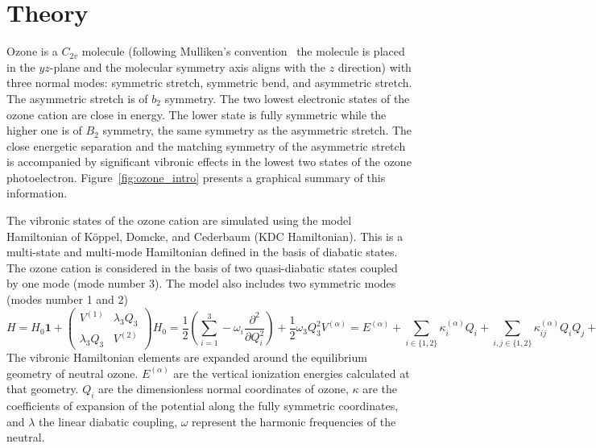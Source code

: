 \documentclass[
12pt,
a4paper,
prb,
superscriptaddress,
]{revtex4}
\begin{document}
\section{Theory}

Ozone is a $C_{2v}$ molecule (following Mulliken's
convention~\cite{Mulliken:55:symnot} the molecule is placed in the $yz$-plane
and the molecular symmetry axis aligns with the $z$ direction) with three
normal modes: symmetric stretch, symmetric bend, and asymmetric stretch.  The
asymmetric stretch is of $b_2$ symmetry. The two lowest electronic states of
the ozone cation are close in energy. The lower state is fully symmetric while
the higher one is of $B_2$ symmetry, the same symmetry as the asymmetric
stretch. The close energetic separation and the matching symmetry of the
asymmetric stretch is accompanied by significant vibronic effects in the
lowest two states of the ozone photoelectron.  Figure~\ref{fig:ozone_intro}
presents a graphical summary of this information.

The vibronic states of the ozone cation are simulated using the model
Hamiltonian of K{\"o}ppel, Domcke, and Cederbaum (KDC
Hamiltonian).\cite{Cederbaum:LVC:84,KDC:81,Koppel:CIbookCh7:04} This is a
multi-state and multi-mode Hamiltonian defined in the basis of diabatic
states. The ozone cation is considered in the basis of two quasi-diabatic
states coupled by one mode (mode number 3). The model also includes two
symmetric modes (modes number 1 and 2)
\begin{subequations}
    \begin{equation}
        H = H _0 \mathbf{1}
        +
        \begin{pmatrix}
            V ^{(1)}  & \lambda _3 Q _3\\
            \lambda _3 Q _3 & V ^{(2)}
        \end{pmatrix}
    \end{equation}
    \begin{equation}
        H _0 = 
        \frac{1}{2} \left(\sum _{i = 1}^3 
        - \omega _i \frac{\partial ^2}{\partial Q _i ^2 }\right)
        + \frac{1}{2}\omega _3 Q _3 ^2
    \end{equation}
    \begin{equation}
        V ^{(\alpha)} = 
        E ^{(\alpha)} 
        + \sum _{i \in \{1,2\}} 
            \kappa ^{(\alpha)} _i Q _i 
        + \sum _{i,j \in \{1,2\}} 
            \kappa ^{(\alpha)} _{ij} Q _i Q _j 
        + \sum _{i,j,k \in \{1,2\}} 
            \kappa ^{(\alpha)} _{ijk} Q _i Q _j Q _k 
        + \sum _{i,j,k,l \in \{1,2\}} 
            \kappa ^{(\alpha)} _{ijkl} Q_i Q _j Q _k Q _l.
    \end{equation}
    \label{eq:KDC}
\end{subequations}
The vibronic Hamiltonian elements are expanded around the equilibrium geometry
of neutral ozone. $E ^{(\alpha)}$ are the vertical ionization energies
calculated at that geometry. $Q_i$ are the dimensionless normal coordinates of
ozone, $\kappa$ are the coefficients of expansion of the potential along the
fully symmetric coordinates, and $\lambda$ the linear diabatic coupling,
$\omega$ represent the harmonic frequencies of the neutral.
\end{document}
